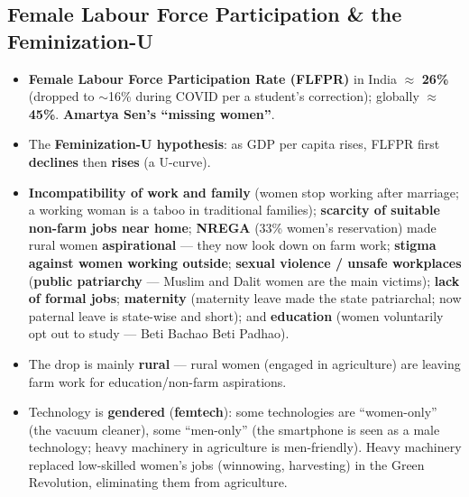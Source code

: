 \sectiondivider

\subsection{Female Labour Force Participation \& the Feminization-U}

\begin{DataFact}
\begin{itemize}
    \item \textbf{Female Labour Force Participation Rate (FLFPR)} in India $\approx$ \textbf{26\%} (dropped to $\sim$16\% during COVID per a student's correction); globally $\approx$ \textbf{45\%}. \textbf{Amartya Sen's ``missing women''}.
    \item The \textbf{Feminization-U hypothesis}: as GDP per capita rises, FLFPR first \textbf{declines} then \textbf{rises} (a U-curve).
\end{itemize}
\end{DataFact}

\begin{KeyConcept}
\begin{itemize}
    \item \textbf{Incompatibility of work and family} (women stop working after marriage; a working woman is a taboo in traditional families); \textbf{scarcity of suitable non-farm jobs near home}; \textbf{NREGA} (33\% women's reservation) made rural women \textbf{aspirational} --- they now look down on farm work; \textbf{stigma against women working outside}; \textbf{sexual violence / unsafe workplaces} (\textbf{public patriarchy} --- Muslim and Dalit women are the main victims); \textbf{lack of formal jobs}; \textbf{maternity} (maternity leave made the state patriarchal; now paternal leave is state-wise and short); and \textbf{education} (women voluntarily opt out to study --- Beti Bachao Beti Padhao).
    \item The drop is mainly \textbf{rural} --- rural women (engaged in agriculture) are leaving farm work for education/non-farm aspirations.
\end{itemize}
\end{KeyConcept}

\begin{CriticalPoint}
\begin{itemize}
    \item Technology is \textbf{gendered} (\textbf{femtech}): some technologies are ``women-only'' (the vacuum cleaner), some ``men-only'' (the smartphone is seen as a male technology; heavy machinery in agriculture is men-friendly). Heavy machinery replaced low-skilled women's jobs (winnowing, harvesting) in the Green Revolution, eliminating them from agriculture.
\end{itemize}
\end{CriticalPoint}

